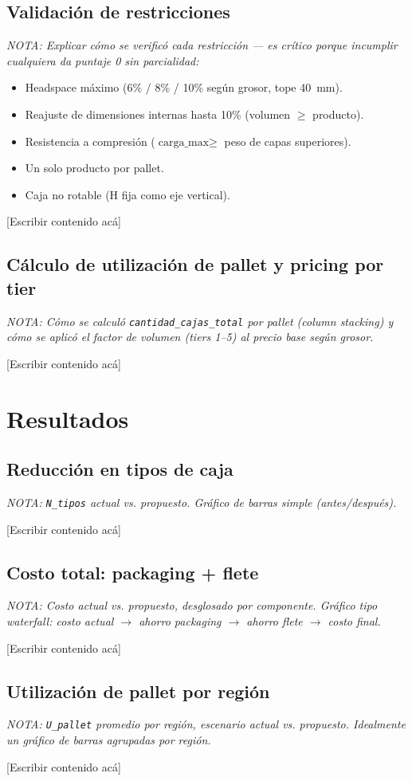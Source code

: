 \documentclass[11pt]{article}
\newcommand{\nota}[1]{{\itshape\color{notegray}\small NOTA: #1}\par\vspace{2pt}}
\newenvironment{notalist}{\begin{itemize}[itemsep=1pt,topsep=2pt,leftmargin=1.4em]\itshape\color{notegray}\small}{\end{itemize}\vspace{2pt}}
\newcommand{\placeholder}{\color{placeholdergray}[Escribir contenido acá]\color{black}\par\vspace{6pt}}
\begin{document}
\subsection{Validación de restricciones}
\nota{Explicar cómo se verificó cada restricción --- es crítico porque incumplir cualquiera da puntaje 0 sin parcialidad:}
\begin{notalist}
\item Headspace máximo (6\% / 8\% / 10\% según grosor, tope 40~mm).
\item Reajuste de dimensiones internas hasta 10\% (volumen $\geq$ producto).
\item Resistencia a compresión ($\text{carga\_max} \geq$ peso de capas superiores).
\item Un solo producto por pallet.
\item Caja no rotable (H fija como eje vertical).
\end{notalist}
\placeholder

\subsection{Cálculo de utilización de pallet y pricing por tier}
\nota{Cómo se calculó \texttt{cantidad\_cajas\_total} por pallet (column stacking) y cómo se aplicó el factor de volumen (tiers 1--5) al precio base según grosor.}
\placeholder

\section{Resultados}

\subsection{Reducción en tipos de caja}
\nota{\texttt{N\_tipos} actual vs. propuesto. Gráfico de barras simple (antes/después).}
\placeholder

\subsection{Costo total: packaging + flete}
\nota{Costo actual vs. propuesto, desglosado por componente. Gráfico tipo waterfall: costo actual $\rightarrow$ ahorro packaging $\rightarrow$ ahorro flete $\rightarrow$ costo final.}
\placeholder

\subsection{Utilización de pallet por región}
\nota{\texttt{U\_pallet} promedio por región, escenario actual vs. propuesto. Idealmente un gráfico de barras agrupadas por región.}
\placeholder
\end{document}
